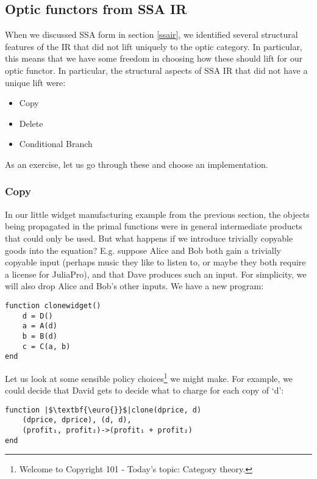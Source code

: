 \documentclass[letterpaper, 10 pt, conference]{ieeeconf}  %
\begin{document}
\subsection{Optic functors from SSA IR}

When we discussed SSA form in section \ref{ssair}, we identified several
structural features of the IR that did not lift uniquely to the optic category.
In particular, this means that we have some freedom in choosing how these should
lift for our optic functor. In particular, the structural aspects of SSA IR that
did not have a unique lift were:

\begin{itemize}
\item Copy
\item Delete
\item Conditional Branch
\end{itemize}

As an exercise, let us go through these and choose an implementation.

\subsubsection{Copy}

In our little widget manufacturing example from the previous section, the objects
being propagated in the primal functions were in general intermediate products
that could only be used. But what happens if we introduce trivially copyable
goods into the equation? E.g. suppose Alice and Bob both gain a trivially
copyable input (perhaps music they like to listen to, or maybe they both
require a license for JuliaPro), and that Dave produces such an input.
For simplicity, we will also drop Alice and Bob's other inputs. We have a new
program:

\begin{verbatim}
function clonewidget()
    d = D()
    a = A(d)
    b = B(d)
    c = C(a, b)
end
\end{verbatim}

Let us look at some sensible policy choices\footnote{Welcome to Copyright 101 - Today's topic: Category theory.} we might make.
For example, we could decide that David gets to decide what to charge for each copy of `d':

\begin{verbatim}
function |$\textbf{\euro{}}$|clone(dprice, d)
    (dprice, dprice), (d, d),
    (profit₁, profit₂)->(profit₁ + profit₂)
end
\end{verbatim}
\end{document}
